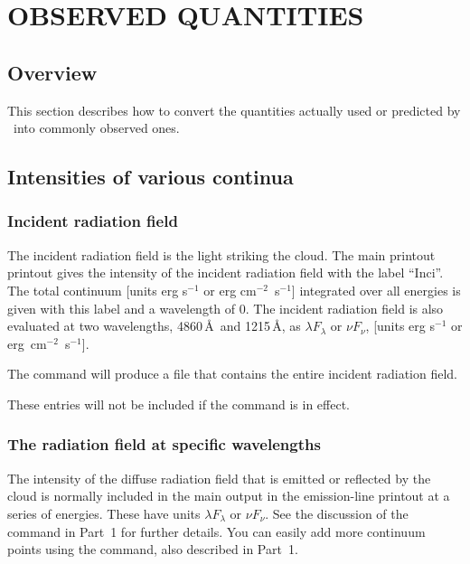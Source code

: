 \chapter{OBSERVED QUANTITIES}
\label{sec:ObservedQuantities}

\section{Overview}

This section describes how to convert the quantities actually used or
predicted by \Cloudy\ into commonly observed ones.

\section{Intensities of various continua}

\subsection{Incident radiation field}

The incident radiation field is the light striking the cloud.
The
main printout printout gives the intensity of the
incident radiation field with
the label ``Inci''.
The total continuum [units erg s$^{-1}$ or erg cm$^{-2}$~s$^{-1}$]
integrated over all energies is given with this label
and a wavelength of 0.
The incident
radiation field is also evaluated at two wavelengths,
4860\,\AA\ and 1215\,\AA ,
as $\lambda F_\lambda $ or $\nu F_\nu$,
[units erg s$^{-1}$ or erg~cm$^{-2}$~s$^{-1}$].

The  command will produce a file that
contains the entire incident radiation field.

These entries will not be included if the  command
is in effect.

\subsection{The radiation field at specific wavelengths}

The intensity of the diffuse radiation field that is
emitted or reflected by the cloud is normally included in the main output
in the emission-line printout at a series of energies.  These have units
$\lambda F_\lambda $ or $\nu F_\nu$. See the discussion of the
 command in Part~1 for further details.
You can easily add more continuum points using the
 command, also described in Part~1.

